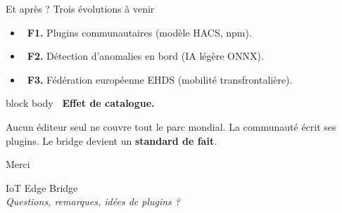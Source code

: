 \documentclass[10pt,aspectratio=169,xcolor={table}]{beamer}
\newcommand{\faChartLine}{}\newcommand{\faBalanceScale}{}%
\newenvironment{bridgeinfo}[1][Note]{%
  \begin{beamercolorbox}[wd=\textwidth,sep=2mm,rounded=true]{block body}%
    \footnotesize\textbf{\color{bridgeblue}#1.}\par\vspace{1mm}%
}{%
  \end{beamercolorbox}%
}
\newcommand{\PartCurrent}{}
\newcommand{\ChCurrent}{}
\newcommand{\partref}[1]{\renewcommand{\PartCurrent}{#1}}
\newcommand{\chref}[1]{\renewcommand{\ChCurrent}{#1}}
\begin{document}
\partref{Ouverture sur le futur}
\chref{Roadmap}
\begin{frame}{Et apr\`es ? Trois \'evolutions \`a venir}

\begin{itemize}[leftmargin=*, itemsep=0.5em]
  \item \textcolor{bridgegreen}{\faPlug}~\textbf{F1.} Plugins communautaires (mod\`ele HACS, npm).
  \item \textcolor{bridgeteal}{\faChartLine}~\textbf{F2.} D\'etection d'anomalies en bord (IA l\'eg\`ere ONNX).
  \item \textcolor{bridgeblue}{\faNetworkWired}~\textbf{F3.} F\'ed\'eration europ\'eenne EHDS (mobilit\'e transfrontali\`ere).
\end{itemize}

\vspace{0.6em}
\begin{bridgeinfo}[\faNetworkWired~Effet de catalogue]
Aucun \'editeur seul ne couvre tout le parc mondial. La communaut\'e \'ecrit ses plugins. Le bridge devient un \textbf{standard de fait}.
\end{bridgeinfo}
\end{frame}

\partref{}
\chref{}
\begin{frame}[plain]{Merci}
  \vspace{1.5cm}
  \begin{center}
    {\Large\color{bridgeblue} IoT Edge Bridge}\\[4mm]
    {\large\itshape Questions, remarques, id\'ees de plugins ?}
  \end{center}
\end{frame}
\end{document}
